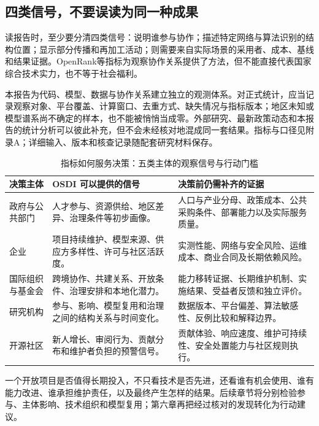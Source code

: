 \subsection{四类信号，不要误读为同一种成果}
读报告时，至少要分清四类信号：说明谁参与协作；描述特定网络与算法识别的结构位置；显示部分传播和再加工活动；则需要来自实际场景的采用者、成本、基线和结果证据。OpenRank等指标为观察协作关系提供了方法，但不能直接代表国家综合技术实力，也不等于社会福利。

 本报告为代码、模型、数据与协作关系建立独立的观测体系。对正式统计，应当记录观察对象、平台覆盖、计算窗口、去重方式、缺失情况与指标版本；地区未知或模型谱系尚不确定的样本，也不能被悄悄当成零。外部研究、最新政策动态和本报告的统计分析可以彼此补充，但不会未经核对地混成同一套结果。指标与口径见附录A；详细输入、版本和核查记录随配套研究材料保存。

\begin{table}[H]\centering\small
\caption{指标如何服务决策：五类主体的观察信号与行动门槛}
\label{ch1-tab:decision}
\begin{tabularx}{\linewidth}{>{\raggedright\arraybackslash}p{25mm}>{\raggedright\arraybackslash}p{50mm}X}
\toprule 决策主体 & OSDI 可以提供的信号 & 决策前仍需补齐的证据 \\\midrule
政府与公共部门 & 人才参与、资源供给、地区差异、治理条件等初步画像。 & 人口与产业分母、政策成本、公共采购条件、部署能力以及实际服务质量。 \\
企业 & 项目持续维护、模型来源、供应方多样性、许可与社区活跃度。 & 实测性能、网络与安全风险、运维成本、商业合同及长期依赖风险。 \\
国际组织与基金会 & 跨境协作、共建关系、开放条件、治理安排和本地化潜力。 & 能力移转证据、长期维护机制、实施结果、受益者反馈和独立评价。 \\
研究机构 & 参与、影响、模型复用和治理之间的结构关系与时间变化。 & 数据版本、平台偏差、算法敏感性、反例比较和解释边界。 \\
开源社区 & 新人增长、审阅行为、贡献分布和维护者负担的预警信号。 & 贡献体验、响应速度、维护可持续性、安全处置能力与社区规则执行。 \\\bottomrule
\end{tabularx}
\end{table}



 一个开放项目是否值得长期投入，不只看技术是否先进，还看谁有机会使用、谁有能力改进、谁承担维护责任，以及最终产生怎样的结果。后续章节将分别检验参与、主体影响、技术组织和模型复用；第六章再把经过核对的发现转化为行动建议。
